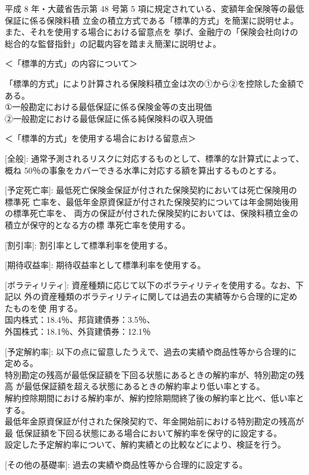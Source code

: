 \documentclass[report,gutter=10mm,fore-edge=10mm,uplatex,dvipdfmx]{jlreq}
\begin{document}

平成 8 年・大蔵省告示第 48 号第 5 項に規定されている、変額年金保険等の最低保証に係る保険料積
立金の積立方式である「標準的方式」を簡潔に説明せよ。また、それを使用する場合における留意点を
挙げ、金融庁の「保険会社向けの総合的な監督指針」の記載内容を踏まえ簡潔に説明せよ。

\answer{}
＜「標準的方式」の内容について＞

「標準的方式」により計算される保険料積立金は次の①から②を控除した金額である。\\
①一般勘定における最低保証に係る保険金等の支出現価\\
②一般勘定における最低保証に係る純保険料の収入現価

＜「標準的方式」を使用する場合における留意点＞

[全般]: 通常予測されるリスクに対応するものとして、標準的な計算式によって、概ね
50％の事象をカバーできる水準に対応する額を算出するものとする。

[予定死亡率]: 最低死亡保険金保証が付された保険契約においては死亡保険用の標準死
亡率を、最低年金原資保証が付された保険契約については年金開始後用の標準死亡率を、
両方の保証が付された保険契約においては、保険料積立金の積立が保守的となる方の標
準死亡率を使用する。

[割引率]: 割引率として標準利率を使用する。

[期待収益率]: 期待収益率として標準利率を使用する。

[ボラティリティ]: 資産種類に応じて以下のボラティリティを使用する。なお、下記以
外の資産種類のボラティリティに関しては過去の実績等から合理的に定めたものを使
用する。\\
国内株式：18.4％、邦貨建債券：3.5％、\\
外国株式：18.1％、外貨建債券：12.1％

[予定解約率]: 以下の点に留意したうえで、過去の実績や商品性等から合理的に定める。\\
特別勘定の残高が最低保証額を下回る状態にあるときの解約率が、特別勘定の残高
が最低保証額を超える状態にあるときの解約率より低い率とする。\\
解約控除期間における解約率が、解約控除期間終了後の解約率と比べ、低い率とする。\\
最低年金原資保証が付された保険契約で、年金開始前における特別勘定の残高が最
低保証額を下回る状態にある場合において解約率を保守的に設定する。\\
設定した予定解約率について、解約実績との比較などにより、検証を行う。

[その他の基礎率]: 過去の実績や商品性等から合理的に設定する。
\end{document}
